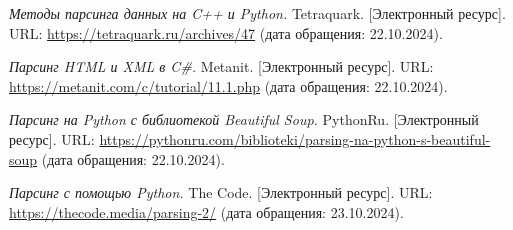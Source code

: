 
\renewcommand{\refname}{\begin{center}\MakeUppercase{Список использованных источников}\end{center}}

\begin{thebibliography}{9}

\textit{Методы парсинга данных на C++ и Python.} Tetraquark. [Электронный ресурс]. URL: \url{https://tetraquark.ru/archives/47} (дата обращения: 22.10.2024).

\textit{Парсинг HTML и XML в C\#.} Metanit. [Электронный ресурс]. URL: \url{https://metanit.com/c/tutorial/11.1.php} (дата обращения: 22.10.2024).

\textit{Парсинг на Python с библиотекой Beautiful Soup.} PythonRu. [Электронный ресурс]. URL: \url{https://pythonru.com/biblioteki/parsing-na-python-s-beautiful-soup} (дата обращения: 22.10.2024).

\textit{Парсинг с помощью Python.} The Code. [Электронный ресурс]. URL: \url{https://thecode.media/parsing-2/} (дата обращения: 23.10.2024).
  
\end{thebibliography}